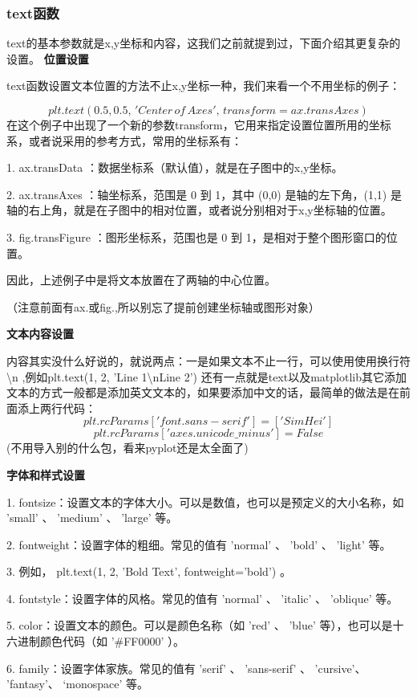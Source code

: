 \documentclass[12pt]{article}
\begin{document}
\subsubsection{text函数}\label{text函数}
text的基本参数就是x,y坐标和内容，这我们之前就提到过，下面介绍其更复杂的设置。
\noindent\textbf{位置设置}

text函数设置文本位置的方法不止x,y坐标一种，我们来看一个不用坐标的例子：

\[plt.text(0.5, 0.5,\, 'Center\, of\, Axes',\, transform=ax.transAxes)\]
在这个例子中出现了一个新的参数transform，它用来指定设置位置所用的坐标系，或者说采用的参考方式，常用的坐标系有：

1.   ax.transData  ：数据坐标系（默认值），就是在子图中的x,y坐标。

2.   ax.transAxes  ：轴坐标系，范围是 0 到 1，其中 (0,0) 是轴的左下角，(1,1) 是轴的右上角，就是在子图中的相对位置，或者说分别相对于x,y坐标轴的位置。

3.   fig.transFigure  ：图形坐标系，范围也是 0 到 1，是相对于整个图形窗口的位置。

因此，上述例子中是将文本放置在了两轴的中心位置。

（注意前面有ax.或fig.,所以别忘了提前创建坐标轴或图形对象）

\noindent\textbf{文本内容设置}

内容其实没什么好说的，就说两点：一是如果文本不止一行，可以使用使用换行符\textbackslash{}n ,例如plt.text(1, 2, 'Line 1\textbackslash{}nLine 2')   
还有一点就是text以及matplotlib其它添加文本的方式一般都是添加英文文本的，如果要添加中文的话，最简单的做法是在前面添上两行代码：
\[plt.rcParams['font.sans-serif'] = ['SimHei']\]
\[plt.rcParams['axes.unicode\_minus'] = False \]
(不用导入别的什么包，看来pyplot还是太全面了)

\noindent\textbf{字体和样式设置}

1. fontsize：设置文本的字体大小。可以是数值，也可以是预定义的大小名称，如   'small'  、  'medium'  、  'large'   等。


2. fontweight：设置字体的粗细。常见的值有   'normal'  、  'bold'  、  'light'   等。

3. 例如，  plt.text(1, 2, 'Bold Text', fontweight='bold')  。

4. fontstyle：设置字体的风格。常见的值有   'normal'  、  'italic'  、  'oblique'   等。

5. color：设置文本的颜色。可以是颜色名称（如   'red'  、  'blue'   等），也可以是十六进制颜色代码（如   '\#FF0000'  ）。


6. family：设置字体家族。常见的值有   'serif'  、  'sans-serif'  、  'cursive'、   'fantasy'、  ‘monospace’ 等。
\end{document}
